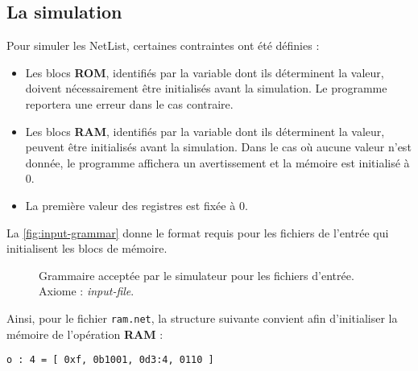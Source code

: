 \documentclass[french, 12pt]{article}
\begin{document}
\subsection{La simulation}

Pour simuler les NetList, certaines contraintes ont été définies :
\begin{itemize}
      \item Les blocs \textbf{ROM}, identifiés par la variable dont ils
            déterminent la valeur, doivent nécessairement être initialisés avant
            la simulation. Le programme reportera une erreur dans le cas contraire.
      \item Les blocs \textbf{RAM}, identifiés par la variable dont ils
            déterminent la valeur, peuvent être initialisés avant la simulation.
            Dans le cas où aucune valeur n'est donnée, le programme affichera
            un avertissement et la mémoire est initialisé à $0$.
      \item La première valeur des registres est fixée à $0$.
\end{itemize}

La \autoref{fig:input-grammar} donne le format requis pour les fichiers de l'entrée
qui initialisent les blocs de mémoire.

\begin{figure}[htp]
      \caption{Grammaire acceptée par le simulateur pour les fichiers d'entrée. Axiome : \textit{input-file}.}
      \label{fig:input-grammar}
\end{figure}

Ainsi, pour le fichier \verb|ram.net|, la structure suivante convient afin
d'initialiser la mémoire de l'opération \textbf{RAM} :
\begin{verbatim}
o : 4 = [ 0xf, 0b1001, 0d3:4, 0110 ]
\end{verbatim}
\end{document}
